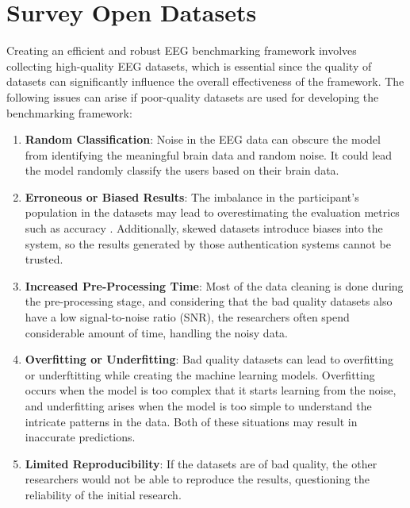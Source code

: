 \section{Survey Open Datasets}
\label{sec:Solution Approach:Survey Open Datasets}
Creating an efficient and robust EEG benchmarking framework involves collecting high-quality EEG datasets, which is essential since the quality of datasets can significantly influence the overall effectiveness of the framework. The following issues can arise if poor-quality datasets are used for developing the benchmarking framework: 
\begin{enumerate}
\item \textbf{Random Classification}: Noise in the EEG data can obscure the model from identifying the meaningful brain data and random noise. It could lead the model randomly classify the users based on their brain data.
    
\item \textbf{Erroneous or Biased Results}: The imbalance in the participant's population in the datasets may lead to overestimating the evaluation metrics such as accuracy \cite{sugrim_robust_metrics}. Additionally, skewed datasets introduce biases into the system, so the results generated by those authentication systems cannot be trusted.    

\item \textbf{Increased Pre-Processing Time}: Most of the data cleaning is done during the pre-processing stage, and considering that the bad quality datasets also have a low signal-to-noise ratio (SNR), the researchers often spend considerable amount of time, handling the noisy data.

\item \textbf{Overfitting or Underfitting}: Bad quality datasets can lead to overfitting or underftitting while creating the machine learning models. Overfitting occurs when the model is too complex that it starts learning from the noise, and underfitting arises when the model is too simple to understand the intricate patterns in the data. Both of these situations may result in inaccurate predictions. 

\item \textbf{Limited Reproducibility}: If the datasets are of bad quality, the other researchers would not be able to reproduce the results, questioning the reliability of the initial research. 
\end{enumerate}


